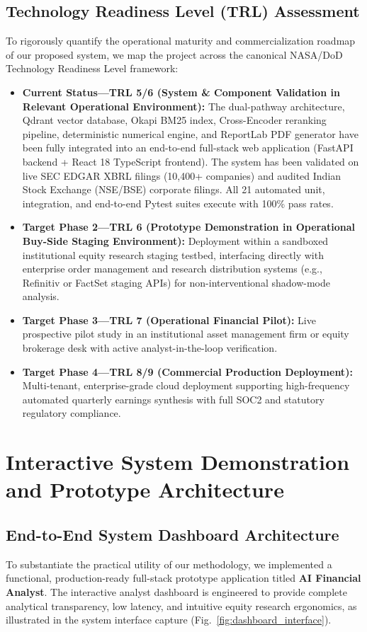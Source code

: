 \documentclass[conference]{IEEEtran}
\begin{document}
\subsection{Technology Readiness Level (TRL) Assessment}
To rigorously quantify the operational maturity and commercialization roadmap of our proposed system, we map the project across the canonical NASA/DoD Technology Readiness Level framework:
\begin{itemize}
    \item \textbf{Current Status---TRL 5/6 (System \& Component Validation in Relevant Operational Environment):} The dual-pathway architecture, Qdrant vector database, Okapi BM25 index, Cross-Encoder reranking pipeline, deterministic numerical engine, and ReportLab PDF generator have been fully integrated into an end-to-end full-stack web application (FastAPI backend + React 18 TypeScript frontend). The system has been validated on live SEC EDGAR XBRL filings (10,400+ companies) and audited Indian Stock Exchange (NSE/BSE) corporate filings. All 21 automated unit, integration, and end-to-end Pytest suites execute with 100\% pass rates.
    \item \textbf{Target Phase 2---TRL 6 (Prototype Demonstration in Operational Buy-Side Staging Environment):} Deployment within a sandboxed institutional equity research staging testbed, interfacing directly with enterprise order management and research distribution systems (e.g., Refinitiv or FactSet staging APIs) for non-interventional shadow-mode analysis.
    \item \textbf{Target Phase 3---TRL 7 (Operational Financial Pilot):} Live prospective pilot study in an institutional asset management firm or equity brokerage desk with active analyst-in-the-loop verification.
    \item \textbf{Target Phase 4---TRL 8/9 (Commercial Production Deployment):} Multi-tenant, enterprise-grade cloud deployment supporting high-frequency automated quarterly earnings synthesis with full SOC2 and statutory regulatory compliance.
\end{itemize}

\section{Interactive System Demonstration and Prototype Architecture}

\subsection{End-to-End System Dashboard Architecture}
To substantiate the practical utility of our methodology, we implemented a functional, production-ready full-stack prototype application titled \textbf{AI Financial Analyst}. The interactive analyst dashboard is engineered to provide complete analytical transparency, low latency, and intuitive equity research ergonomics, as illustrated in the system interface capture (Fig.~\ref{fig:dashboard_interface}).
\end{document}
